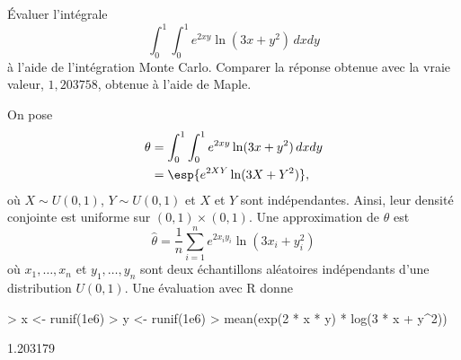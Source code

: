 \begin{exercice}
  Évaluer l'intégrale
  \begin{displaymath}
    \int_0^1 \int_0^1 e^{2xy} \ln(3x + y^2)\, dx dy
  \end{displaymath}
  à l'aide de l'intégration Monte Carlo. Comparer la réponse obtenue
  avec la vraie valeur, $1,203758$, obtenue à l'aide de Maple.
  \begin{sol}
    On pose
    \begin{align*}
      \theta
      &= \int_0^1 \int_0^1 e^{2xy} \ln(3x + y^2)\, dx dy \\
      &= \esp{e^{2XY} \ln(3X + Y^2)},
    \end{align*}
    où $X \sim U(0, 1)$, $Y \sim U(0, 1)$ et $X$ et $Y$ sont
    indépendantes. Ainsi, leur densité conjointe est uniforme sur $(0,
    1) \times (0, 1)$. Une approximation de $\theta$ est
    \begin{displaymath}
      \hat{\theta} = \frac{1}{n} \sum_{i = 1}^n
      e^{2 x_i y_i} \ln(3x_i + y_i^2)
    \end{displaymath}
    où $x_1, \dots, x_n$ et $y_1, \dots, y_n$ sont deux échantillons
    aléatoires indépendants d'une distribution $U(0, 1)$. Une
    évaluation avec \textsf{R} donne
\begin{Schunk}
\begin{Sinput}
> x <- runif(1e6)
> y <- runif(1e6)
> mean(exp(2 * x * y) * log(3 * x + y^2))
\end{Sinput}
\begin{Soutput}
[1] 1.203179
\end{Soutput}
\end{Schunk}
  \end{sol}
\end{exercice}

